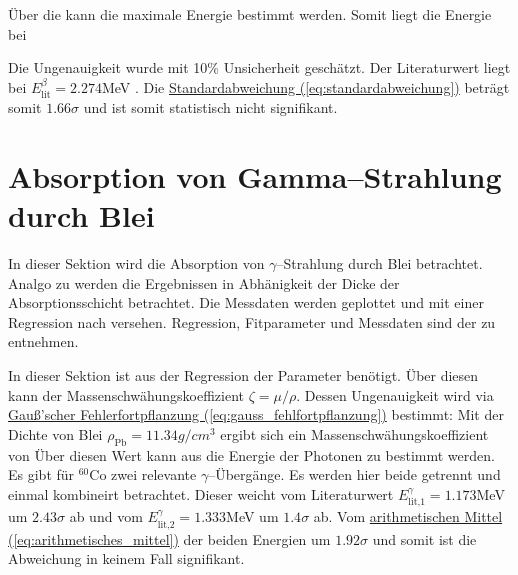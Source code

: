 
Über die  kann die maximale Energie bestimmt werden. Somit liegt die Energie bei

Die Ungenauigkeit wurde mit 10\% Unsicherheit geschätzt. Der Literaturwert liegt bei $E_\text{lit}^\beta = 2.274$MeV \cite{skriptPAP22}. Die \hyperref[eq:standardabweichung]{Standardabweichung (\ref*{eq:standardabweichung})} beträgt somit $1.66\sigma$ und ist somit statistisch nicht signifikant.


\section{Absorption von Gamma--Strahlung durch Blei}
\label{sec:A2}
In dieser Sektion wird die Absorption von $\gamma$--Strahlung durch Blei betrachtet. Analgo zu  werden die Ergebnissen in Abhänigkeit der Dicke der Absorptionsschicht betrachtet. Die Messdaten werden geplottet und mit einer Regression nach  versehen.
Regression, Fitparameter und Messdaten sind der  zu entnehmen.

In dieser Sektion ist aus der Regression der Parameter
benötigt. Über diesen kann der Massenschwähungskoeffizient $\zeta = \mu/\rho$. Dessen Ungenauigkeit wird via \hyperref[eq:gauss_fehlfortpflanzung]{Gauß'scher Fehlerfortpflanzung (\ref*{eq:gauss_fehlfortpflanzung})} bestimmt:
Mit der Dichte von Blei $\rho_\mathrm{Pb} = 11.34  g/cm^3$ ergibt sich ein Massenschwähungskoeffizient von
 \label{eq:masskof}
Über diesen Wert kann aus  die Energie der Photonen zu
bestimmt werden.
Es gibt für $^{60}\mathrm{Co}$ zwei relevante $\gamma$--Übergänge. Es werden hier beide getrennt und einmal kombineirt betrachtet.
Dieser weicht vom Literaturwert $E_\text{lit,1}^\gamma = 1.173$MeV um $2.43\sigma$ ab und vom $E_\text{lit,2}^\gamma = 1.333$MeV um $1.4\sigma$ ab. 
Vom \hyperref[eq:arithmetisches_mittel]{arithmetischen Mittel (\ref*{eq:arithmetisches_mittel})} der beiden Energien um $1.92\sigma$ und somit ist die Abweichung in keinem Fall signifikant. 

